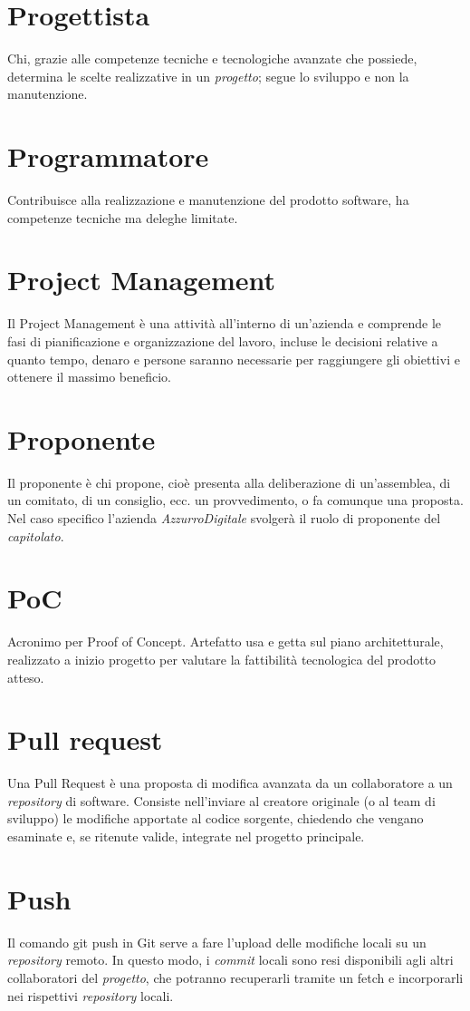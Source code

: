 \section{Progettista}\label{sec:Progettisti}
Chi, grazie alle competenze tecniche e tecnologiche avanzate che possiede, determina le scelte realizzative in un \emph{progetto}; segue lo sviluppo e non la manutenzione.

\section{Programmatore}\label{sec:Programmatori}
Contribuisce alla realizzazione e manutenzione del prodotto software, ha competenze tecniche ma deleghe limitate.

\section{Project Management}
Il Project Management è una attività all’interno di un’azienda e comprende le fasi di pianificazione e organizzazione del lavoro, incluse le decisioni relative a quanto tempo, denaro e persone saranno necessarie per raggiungere gli obiettivi e ottenere il massimo beneficio. 

\section{Proponente}\label{sec:Proponenti}
Il proponente è chi propone, cioè presenta alla deliberazione di un'assemblea, di un comitato, di un consiglio, ecc. un provvedimento, o fa comunque una proposta. Nel caso specifico l'azienda \emph{AzzurroDigitale} svolgerà il ruolo di proponente del \emph{capitolato}.

\section{PoC}\label{sec:Proof of Concept}
Acronimo per Proof of Concept. Artefatto usa e getta sul piano architetturale, realizzato a inizio progetto per valutare la fattibilità tecnologica del prodotto atteso.

\section{Pull request}
Una Pull Request è una proposta di modifica avanzata da un collaboratore a un \emph{repository} di software. Consiste nell'inviare al creatore originale (o al team di sviluppo) le modifiche apportate al codice sorgente, chiedendo che vengano esaminate e, se ritenute valide, integrate nel progetto principale.

\section{Push}
Il comando git push in Git serve a fare l’upload delle modifiche locali su un \emph{repository} remoto. In questo modo, i \emph{commit} locali sono resi disponibili agli altri collaboratori del \emph{progetto}, che potranno recuperarli tramite un fetch e incorporarli nei rispettivi \emph{repository} locali.
